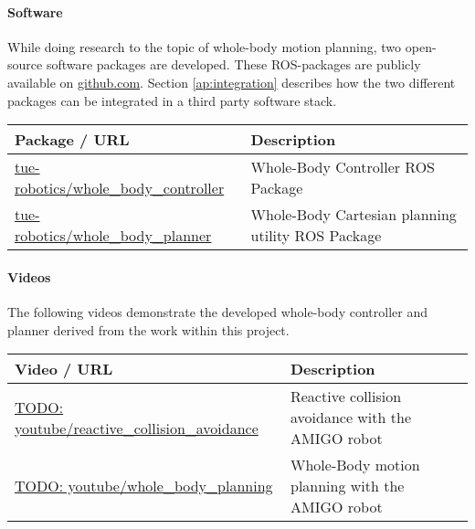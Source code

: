 \paragraph{Software}
While doing research to the topic of whole-body motion planning, two open-source software packages are developed. These ROS-packages are publicly available on \href{http://github.com}{github.com}. Section \ref{ap:integration} describes how the two different packages can be integrated in a third party software stack.
\begin{longtable}{|p{6cm}p{9cm}|}
\hline
\rowcolor[gray]{0.8} \bf Package / URL & \bf Description\\
\hline
\href{https://github.com/tue-robotics/amigo_whole_body_controller}{tue-robotics/whole\_body\_controller} & Whole-Body Controller ROS Package \\
\href{https://github.com/tue-robotics/whole_body_planner}{tue-robotics/whole\_body\_planner} & Whole-Body Cartesian planning utility ROS Package \\
\hline
\end{longtable}

\paragraph{Videos}
\label{videos}
The following videos demonstrate the developed whole-body controller and planner derived from the work within this project. 
\begin{longtable}{|p{6cm}p{9cm}|}
\hline
\rowcolor[gray]{0.8} \bf Video / URL & \bf Description\\
\hline
\href{https://www.youtube.com/watch?v=Fc9SOGC_sMA}{TODO: youtube/reactive\_collision\_avoidance} & Reactive collision avoidance with the AMIGO robot \\
\href{https://www.youtube.com/watch?v=Fc9SOGC_sMA}{TODO: youtube/whole\_body\_planning} & Whole-Body motion planning with the AMIGO robot\\
\hline
\end{longtable}

